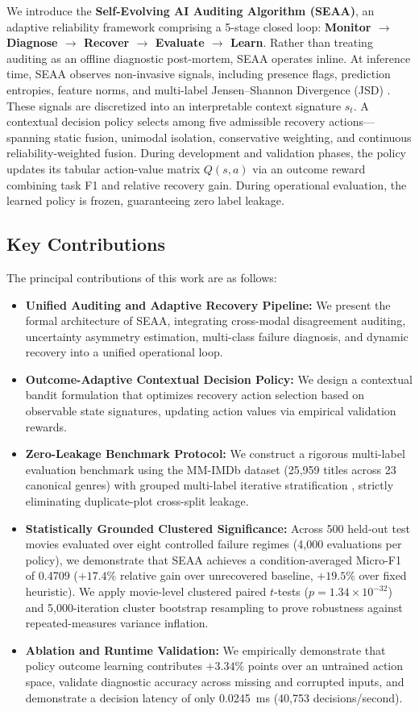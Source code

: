 \documentclass[journal]{IEEEtran}
\begin{document}
We introduce the \textbf{Self-Evolving AI Auditing Algorithm (SEAA)}, an adaptive reliability framework comprising a 5-stage closed loop: \textbf{Monitor $\rightarrow$ Diagnose $\rightarrow$ Recover $\rightarrow$ Evaluate $\rightarrow$ Learn}. Rather than treating auditing as an offline diagnostic post-mortem, SEAA operates inline. At inference time, SEAA observes non-invasive signals, including presence flags, prediction entropies, feature norms, and multi-label Jensen--Shannon Divergence (JSD) \cite{lin1991divergence}. These signals are discretized into an interpretable context signature $s_t$. A contextual decision policy selects among five admissible recovery actions—spanning static fusion, unimodal isolation, conservative weighting, and continuous reliability-weighted fusion. During development and validation phases, the policy updates its tabular action-value matrix $Q(s, a)$ via an outcome reward combining task F1 and relative recovery gain. During operational evaluation, the learned policy is frozen, guaranteeing zero label leakage.

\subsection{Key Contributions}
The principal contributions of this work are as follows:
\begin{itemize}
    \item \textbf{Unified Auditing and Adaptive Recovery Pipeline:} We present the formal architecture of SEAA, integrating cross-modal disagreement auditing, uncertainty asymmetry estimation, multi-class failure diagnosis, and dynamic recovery into a unified operational loop.
    \item \textbf{Outcome-Adaptive Contextual Decision Policy:} We design a contextual bandit formulation that optimizes recovery action selection based on observable state signatures, updating action values via empirical validation rewards.
    \item \textbf{Zero-Leakage Benchmark Protocol:} We construct a rigorous multi-label evaluation benchmark using the MM-IMDb dataset (25,959 titles across 23 canonical genres) with grouped multi-label iterative stratification \cite{sechidis2011stratification}, strictly eliminating duplicate-plot cross-split leakage.
    \item \textbf{Statistically Grounded Clustered Significance:} Across 500 held-out test movies evaluated over eight controlled failure regimes (4,000 evaluations per policy), we demonstrate that SEAA achieves a condition-averaged Micro-F1 of 0.4709 ($+17.4\%$ relative gain over unrecovered baseline, $+19.5\%$ over fixed heuristic). We apply movie-level clustered paired $t$-tests ($p = 1.34 \times 10^{-32}$) and 5,000-iteration cluster bootstrap resampling to prove robustness against repeated-measures variance inflation.
    \item \textbf{Ablation and Runtime Validation:} We empirically demonstrate that policy outcome learning contributes $+3.34\%$ points over an untrained action space, validate diagnostic accuracy across missing and corrupted inputs, and demonstrate a decision latency of only 0.0245~ms (40,753 decisions/second).
\end{itemize}
\end{document}
